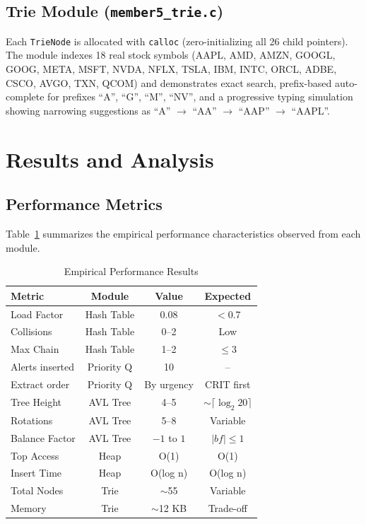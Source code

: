 \documentclass[conference]{IEEEtran}
\begin{document}
\subsection{Trie Module (\texttt{member5\_trie.c})}

Each \texttt{TrieNode} is allocated with \texttt{calloc} (zero-initializing all 26 child pointers). The module indexes 18 real stock symbols (AAPL, AMD, AMZN, GOOGL, GOOG, META, MSFT, NVDA, NFLX, TSLA, IBM, INTC, ORCL, ADBE, CSCO, AVGO, TXN, QCOM) and demonstrates exact search, prefix-based auto-complete for prefixes ``A'', ``G'', ``M'', ``NV'', and a progressive typing simulation showing narrowing suggestions as ``A'' $\rightarrow$ ``AA'' $\rightarrow$ ``AAP'' $\rightarrow$ ``AAPL''.

\section{Results and Analysis}

\subsection{Performance Metrics}

Table~\ref{tab:results} summarizes the empirical performance characteristics observed from each module.

\begin{table}[htbp]
\caption{Empirical Performance Results}
\begin{center}
\begin{tabular}{|l|c|c|c|}
\hline
\textbf{Metric} & \textbf{Module} & \textbf{Value} & \textbf{Expected} \\
\hline
Load Factor & Hash Table & 0.08 & $<$0.7 \\
Collisions & Hash Table & 0--2 & Low \\
Max Chain & Hash Table & 1--2 & $\leq$3 \\
\hline
Alerts inserted & Priority Q & 10 & -- \\
Extract order & Priority Q & By urgency & CRIT first \\
\hline
Tree Height & AVL Tree & 4--5 & $\sim\lceil\log_2 20\rceil$ \\
Rotations & AVL Tree & 5--8 & Variable \\
Balance Factor & AVL Tree & $-1$ to $1$ & $|bf| \leq 1$ \\
\hline
Top Access & Heap & O(1) & O(1) \\
Insert Time & Heap & O(log n) & O(log n) \\
\hline
Total Nodes & Trie & $\sim$55 & Variable \\
Memory & Trie & $\sim$12 KB & Trade-off \\
\hline
\end{tabular}
\label{tab:results}
\end{center}
\end{table}
\end{document}
